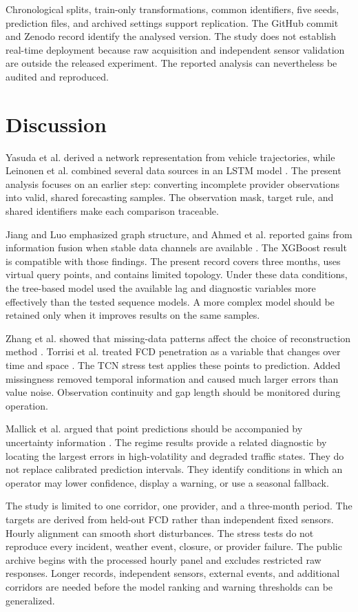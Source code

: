 \documentclass[smallcondensed]{svjour3}
\begin{document}
Chronological splits, train-only transformations, common identifiers, five seeds, prediction files, and archived settings support replication. The GitHub commit and Zenodo record identify the analysed version. The study does not establish real-time deployment because raw acquisition and independent sensor validation are outside the released experiment. The reported analysis can nevertheless be audited and reproduced.

\FloatBarrier
\section{Discussion}
Yasuda et al. derived a network representation from vehicle trajectories, while Leinonen et al. combined several data sources in an LSTM model \cite{ref5,ref6}. The present analysis focuses on an earlier step: converting incomplete provider observations into valid, shared forecasting samples. The observation mask, target rule, and shared identifiers make each comparison traceable.

Jiang and Luo emphasized graph structure, and Ahmed et al. reported gains from information fusion when stable data channels are available \cite{ref1,ref2}. The XGBoost result is compatible with those findings. The present record covers three months, uses virtual query points, and contains limited topology. Under these data conditions, the tree-based model used the available lag and diagnostic variables more effectively than the tested sequence models. A more complex model should be retained only when it improves results on the same samples.

Zhang et al. showed that missing-data patterns affect the choice of reconstruction method \cite{ref9}. Torrisi et al. treated FCD penetration as a variable that changes over time and space \cite{ref8}. The TCN stress test applies these points to prediction. Added missingness removed temporal information and caused much larger errors than value noise. Observation continuity and gap length should be monitored during operation.

Mallick et al. argued that point predictions should be accompanied by uncertainty information \cite{ref11}. The regime results provide a related diagnostic by locating the largest errors in high-volatility and degraded traffic states. They do not replace calibrated prediction intervals. They identify conditions in which an operator may lower confidence, display a warning, or use a seasonal fallback.

The study is limited to one corridor, one provider, and a three-month period. The targets are derived from held-out FCD rather than independent fixed sensors. Hourly alignment can smooth short disturbances. The stress tests do not reproduce every incident, weather event, closure, or provider failure. The public archive begins with the processed hourly panel and excludes restricted raw responses. Longer records, independent sensors, external events, and additional corridors are needed before the model ranking and warning thresholds can be generalized.
\end{document}
